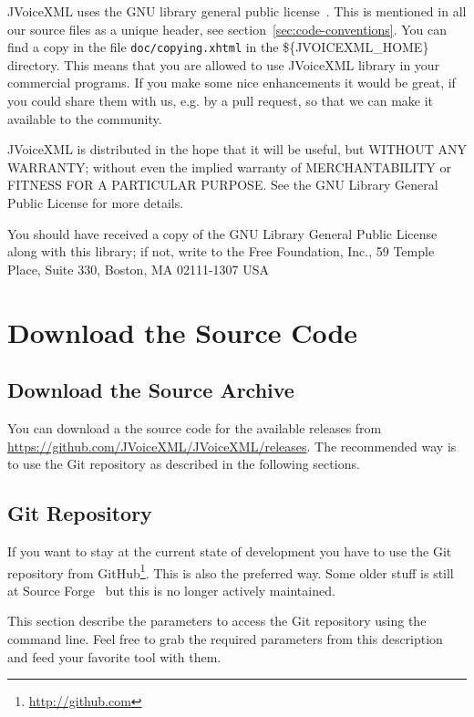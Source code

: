 \documentclass[11pt,a4paper]{article}
\begin{document}
JVoiceXML uses the GNU library general public license~\cite{gnu:lgpg}. 
This is mentioned in all our source files as a unique header, see
section~\ref{sec:code-conventions}.
You can find a copy in the file \texttt{doc/copying.xhtml} in the \$\{JVOICEXML\_HOME\}
directory. This means that you are allowed to use JVoiceXML
library in your commercial programs. If you make some nice
enhancements it would be great, if you could share them
with us, e.g. by a pull request, so that we can make it available to the community.

JVoiceXML is distributed in the hope that it will be useful,
but WITHOUT ANY WARRANTY; without even the implied warranty of
MERCHANTABILITY or FITNESS FOR A PARTICULAR PURPOSE. See the GNU
Library General Public License for more details.

You should have received a copy of the GNU Library General Public
License along with this library; if not, write to the Free
Foundation, Inc., 59 Temple Place, Suite 330, Boston, MA  02111-1307  USA

\section{Download the Source Code}

\subsection{Download the Source Archive}

You can download a the source code for the available releases from 
\url{https://github.com/JVoiceXML/JVoiceXML/releases}. The recommended way is to
use the Git repository as described in the following sections. 

\subsection{Git Repository}
\label{sec:git-repository}

If you want to stay at the current state of development you have to use
the Git repository from GitHub\footnote{\url{http://github.com}}. This is also
the preferred way. Some older stuff is still at Source Forge~\cite{sourceforge}
but this is no longer actively maintained.

This section describe the parameters to access the Git repository 
using the command line. Feel free to grab the required parameters from
this description and feed your favorite tool with them.
\end{document}
